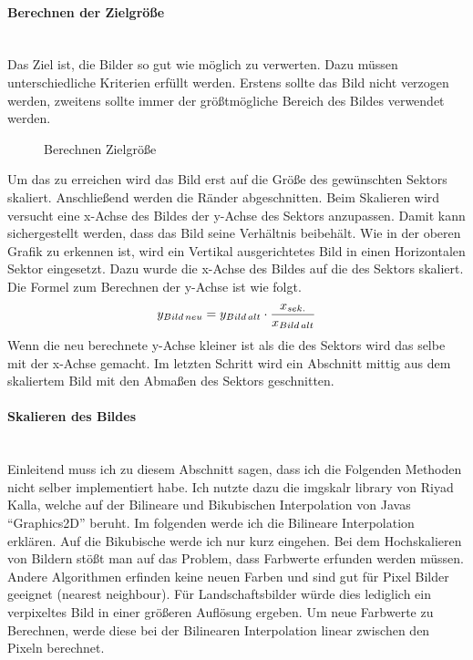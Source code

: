\newpage

\paragraph{Berechnen der Zielgröße}\mbox{}\\
Das Ziel ist, die Bilder so gut wie möglich zu verwerten. Dazu müssen unterschiedliche Kriterien erfüllt werden. Erstens sollte das Bild nicht verzogen werden, zweitens sollte immer der größtmögliche Bereich des Bildes verwendet werden.

\begin{figure}[h]
    \centering
    \fontsize{12pt}{12pt}\selectfont%
    \def\svgwidth{12cm}
    
    \caption[Berechnen Zielgröße]{Berechnen Zielgröße}
\end{figure}

Um das zu erreichen wird das Bild erst auf die Größe des gewünschten Sektors skaliert. Anschließend werden die Ränder abgeschnitten. Beim Skalieren wird versucht eine x-Achse des Bildes der y-Achse des Sektors anzupassen. Damit kann sichergestellt werden, dass das Bild seine Verhältnis beibehält. Wie in der oberen Grafik zu erkennen ist, wird ein Vertikal ausgerichtetes Bild in einen Horizontalen Sektor eingesetzt. Dazu wurde die x-Achse des Bildes auf die des Sektors skaliert. Die Formel zum Berechnen der y-Achse ist wie folgt.
\begin{align}
    y_\mathnormal{Bild\,neu}=y_\mathnormal{Bild\,alt} \cdot \frac{x_\mathnormal{sek.}}{x_\mathnormal{Bild\,alt}}
\end{align}    
Wenn die neu berechnete y-Achse kleiner ist als die des Sektors wird das selbe mit der x-Achse gemacht. Im letzten Schritt wird ein Abschnitt mittig aus dem skaliertem Bild mit den Abmaßen des Sektors geschnitten.

\newpage

\paragraph{Skalieren des Bildes}\mbox{}\\
Einleitend muss ich zu diesem Abschnitt sagen, dass ich die Folgenden Methoden nicht selber implementiert habe. Ich nutzte dazu die imgskalr library von Riyad Kalla, welche auf der Bilineare und Bikubischen Interpolation von Javas ``Graphics2D'' beruht.\cite{Scalr:Kalla} Im folgenden werde ich die Bilineare Interpolation erklären. Auf die Bikubische werde ich nur kurz eingehen.
\medskip
\newline
Bei dem Hochskalieren von Bildern stößt man auf das Problem, dass Farbwerte erfunden werden müssen. Andere Algorithmen erfinden keine neuen Farben und sind gut für Pixel Bilder geeignet (nearest neighbour). Für Landschaftsbilder würde dies lediglich ein verpixeltes Bild in einer größeren Auflösung ergeben. Um neue Farbwerte zu Berechnen, werde diese bei der Bilinearen Interpolation linear zwischen den Pixeln berechnet.

